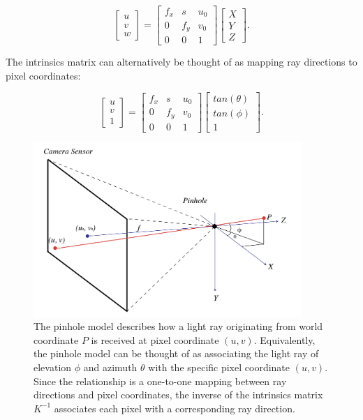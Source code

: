 \documentclass[openany]{book}
\begin{document}
\begin{equation}
\begin{bmatrix}
    u\\
    v\\
    w
\end{bmatrix} = 
\begin{bmatrix}
    f_x & s & u_0 \\ 
    0 & f_y  & v_0 \\ 
    0 & 0 & 1 
\end{bmatrix}
\begin{bmatrix}
    X \\
    Y \\
    Z
\end{bmatrix}.
\end{equation}

The intrinsics matrix can alternatively be thought of as mapping ray directions to pixel coordinates:

\begin{equation}
\begin{bmatrix}
    u\\
    v\\
    1
\end{bmatrix} = 
\begin{bmatrix}
    f_x & s & u_0 \\ 
    0 & f_y  & v_0 \\ 
    0 & 0 & 1 
\end{bmatrix}
\begin{bmatrix}
    tan(\theta) \\
    tan(\phi) \\
    1
\end{bmatrix}.
\end{equation}


\begin{figure}[htbp]
    \centering 
    \includegraphics[width=4in]{images/pinhole.png}
    \caption{The pinhole model describes how a light ray originating from world coordinate $P$ is received at pixel coordinate $(u, v)$. Equivalently, the pinhole model can be thought of as associating the light ray of elevation $\phi$ and azimuth $\theta$ with the specific pixel coordinate $(u, v)$. Since the relationship is a one-to-one mapping between ray directions and pixel coordinates, the inverse of the intrinsics matrix $K^{-1}$ associates each pixel with a corresponding ray direction.}
\end{figure}
\end{document}
